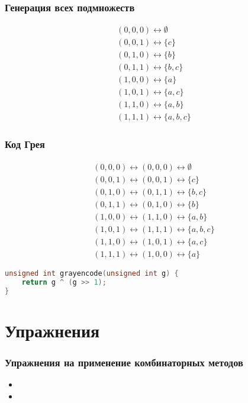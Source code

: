 \documentclass[11pt]{beamer}
\begin{document}
\begin{frame}[fragile]
\frametitle{Генерация всех подмножеств}
\[
\begin{array}{l}
(0,0,0) \leftrightarrow \emptyset \\
(0,0,1) \leftrightarrow \{c\} \\
(0,1,0) \leftrightarrow \{b\} \\
(0,1,1) \leftrightarrow \{b,c\} \\
(1,0,0) \leftrightarrow \{a\} \\
(1,0,1) \leftrightarrow \{a,c\} \\
(1,1,0) \leftrightarrow \{a,b\} \\
(1,1,1) \leftrightarrow \{a,b,c\}
\end{array}
\]
\end{frame}

\begin{frame}[fragile]
\frametitle{Код Грея}
\[
\begin{array}{l}
(0,0,0) \leftrightarrow (0,0,0) \leftrightarrow \emptyset \\
(0,0,1) \leftrightarrow (0,0,1) \leftrightarrow \{c\} \\
(0,1,0) \leftrightarrow (0,1,1) \leftrightarrow \{b,c\} \\
(0,1,1) \leftrightarrow (0,1,0) \leftrightarrow \{b\} \\
(1,0,0) \leftrightarrow (1,1,0) \leftrightarrow \{a,b\} \\
(1,0,1) \leftrightarrow (1,1,1) \leftrightarrow \{a,b,c\} \\
(1,1,0) \leftrightarrow (1,0,1) \leftrightarrow \{a,c\} \\
(1,1,1) \leftrightarrow (1,0,0) \leftrightarrow \{a\}
\end{array}
\]
\begin{lstlisting}[language=c]
unsigned int grayencode(unsigned int g) {
    return g ^ (g >> 1);
}
\end{lstlisting}
\end{frame}

\section{Упражнения}

\begin{frame}
\frametitle{Упражнения на применение комбинаторных методов}
\begin{itemize}
	\item 
	\item 
\end{itemize}
\end{frame}
\end{document}
